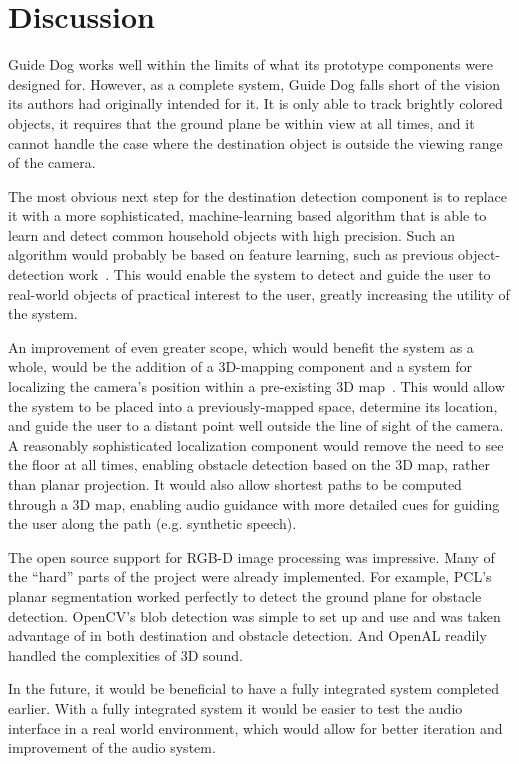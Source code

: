 \section{Discussion}
\label{sec:discussion}

Guide Dog works well within the limits of what its prototype components were
designed for. However, as a complete system, Guide Dog falls short of the vision
its authors had originally intended for it. It is only able to track brightly
colored objects, it requires that the ground plane be within view at all times,
and it cannot handle the case where the destination object is outside the
viewing range of the camera. 

The most obvious next step for the destination detection component is to replace
it with a more sophisticated, machine-learning based algorithm that is able to
learn and detect common household objects with high precision.  Such an
algorithm would probably be based on feature learning, such as previous
object-detection work~\cite{lai_icra12}.  This would enable the system to detect
and guide the user to real-world objects of practical interest to the user,
greatly increasing the utility of the system.

An improvement of even greater scope, which would benefit the system as a whole,
would be the addition of a 3D-mapping component and a system for localizing the
camera's position within a pre-existing 3D
map~\cite{Du:2011:IMI:2030112.2030123}. This would allow the system to be placed
into a previously-mapped space, determine its location, and guide the user to a
distant point well outside the line of sight of the camera. A reasonably
sophisticated localization component would remove the need to see the floor at
all times, enabling obstacle detection based on the 3D map, rather than planar
projection. It would also allow shortest paths to be computed through a 3D map,
enabling audio guidance with more detailed cues for guiding the user along the
path (e.g. synthetic speech).

The open source support for RGB-D image processing was impressive. Many of the
``hard'' parts of the project were already implemented. For example, PCL's
planar segmentation worked perfectly to detect the ground plane for obstacle
detection. OpenCV's blob detection was simple to set up and use and was taken
advantage of in both destination and obstacle detection. And OpenAL readily
handled the complexities of 3D sound.

In the future, it would be beneficial to have a fully integrated system
completed earlier. With a fully integrated system it would be easier to test the
audio interface in a real world environment, which would allow for better
iteration and improvement of the audio system.
